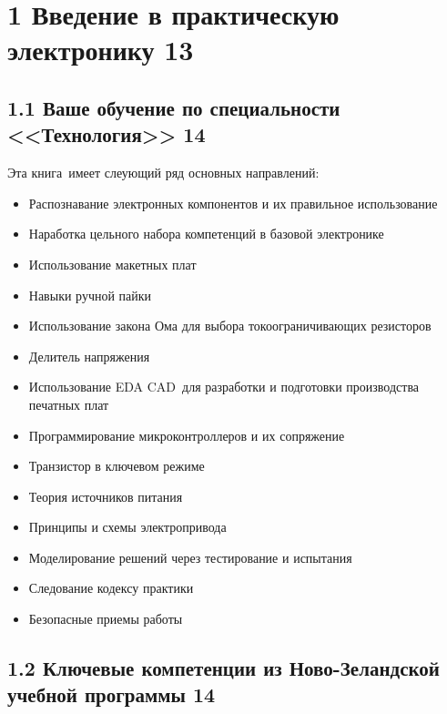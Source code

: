 \chapter{1 Введение в практическую электронику 13}

\section{1.1 Ваше обучение по специальности <<Технология>> 14}

Эта книга\ имеет слеующий ряд основных направлений:

\begin{itemize}
  \item Распознавание электронных компонентов и их правильное использование
  \item Наработка цельного набора компетенций в базовой электронике
  \item Использование макетных плат
  \item Навыки ручной пайки
  \item Использование закона Ома для выбора токоограничивающих резисторов
  \item Делитель напряжения
  \item Использование EDA CAD\ для
  разработки и подготовки производства печатных плат
  \item Программирование микроконтроллеров и их сопряжение
  \item Транзистор в ключевом режиме
  \item Теория источников питания
  \item Принципы и схемы электропривода
  \item Моделирование решений через тестирование и испытания
  \item Следование кодексу практики
  \item Безопасные приемы работы
\end{itemize}

\section{1.2 Ключевые компетенции из Ново-Зеландской учебной программы 14}

